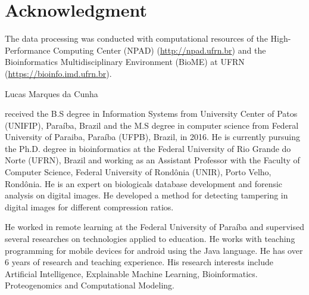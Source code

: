\documentclass{ieeeaccess}
\begin{document}
\section*{Acknowledgment}

The data processing was conducted with computational resources of the High-Performance Computing Center (NPAD) (\url{http://npad.ufrn.br}) and the Bioinformatics Multidisciplinary Environment (BioME) at UFRN (\url{https://bioinfo.imd.ufrn.br}).





%
%




\begin{IEEEbiography}{Lucas Marques da Cunha}

received the B.S degree in Information Systems from University Center of Patos (UNIFIP), Paraíba, Brazil and the M.S degree in computer science from Federal University of Paraiba, Paraíba (UFPB), Brazil, in 2016. He is currently pursuing the Ph.D. degree in bioinformatics at the Federal University of Rio Grande do Norte (UFRN), Brazil and working as an Assistant Professor with the Faculty of Computer Science, Federal University of Rondônia (UNIR), Porto Velho, Rondônia. He is an expert on biologicals database development and forensic analysis on digital images. He developed a method for detecting tampering in digital images for different compression ratios.

He worked in remote learning at the Federal University of Paraíba and supervised several researches on technologies applied to education. He works with teaching programming for mobile devices for android using the Java language. He has over 6 years of research and teaching experience. His research interests include Artificial Intelligence, Explainable Machine Learning, Bioinformatics. Proteogenomics and Computational Modeling.
\end{IEEEbiography}
\end{document}
